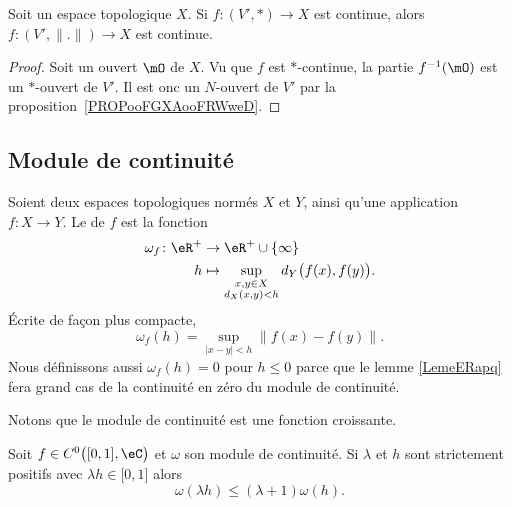 \begin{corollary}
	Soit un espace topologique \( X\). Si \( f\colon (V',*)\to X\) est continue, alors \( f\colon (V',\| . \|)\to X\) est continue.
\end{corollary}

\begin{proof}
	Soit un ouvert \( \mO\) de \( X\). Vu que \( f\) est \( *\)-continue, la partie \( f^{-1}(\mO)\) est un \( *\)-ouvert de \( V'\). Il est onc un \( N\)-ouvert de \( V'\) par la proposition~\ref{PROPooFGXAooFRWweD}.
\end{proof}

\subsection{Module de continuité}

\begin{definition}      \label{DEFooYARJooYyzMMP}
	Soient deux espaces topologiques normés \( X\) et \( Y\),  ainsi qu'une application \( f\colon X\to Y\). Le  de \( f\) est la fonction
	\begin{equation}
		\begin{aligned}
			\omega_f\colon \eR^+ & \to \eR^+\cup\{ \infty \}       \\
			h                    & \mapsto\sup_{\substack{x,y\in X \\d_X(x,y)< h}} d_Y\big( f(x),f(y) \big).
		\end{aligned}
	\end{equation}
	Écrite de façon plus compacte,
	\begin{equation}        \label{EQooKWUVooSORHXN}
		\omega_f(h)=\sup_{| x-y |<h}\| f(x)-f(y) \|.
	\end{equation}
	Nous définissons aussi \( \omega_f(h)=0\) pour \( h\leq 0\) parce que le lemme \ref{LemeERapq} fera grand cas de la continuité en zéro du module de continuité.
\end{definition}

Notons que le module de continuité est une fonction croissante.

\begin{lemma}   \label{LemLUbgYeo}
	Soit \( f\in C^0\big( \mathopen[ 0 , 1 \mathclose],\eC \big)\) et \( \omega\) son module de continuité. Si \( \lambda\) et \( h\) sont strictement positifs avec \( \lambda h\in\mathopen[ 0 , 1 \mathclose]\) alors
	\begin{equation}
		\omega(\lambda h)\leq (\lambda+1)\omega(h).
	\end{equation}
\end{lemma}

